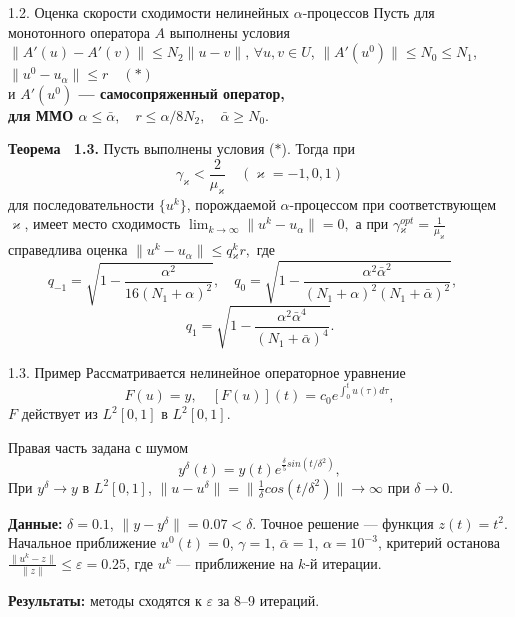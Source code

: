 \documentclass[10pt,pdf, mathserif, hyperref={unicode}]{beamer}
\begin{document}
\begin{frame}{\small 1.2. Оценка скорости сходимости нелинейных $\alpha$-процессов}
		Пусть для монотонного оператора $A$ выполнены условия  $\|A'(u)-A'(v)\|\leqslant N_2\|u-v\|$, $\forall u, v \in U$,	$\|A'(u^0)\| \leqslant N_0\leqslant N_1$,  $\|u^0-u_\alpha\| \leqslant r \quad(*)$ \\ и {\textbf{\color{blue}$A'(u^0)$ --- самосопряженный оператор, \\для ММО $\alpha \leqslant \bar\alpha, \quad r\leqslant \alpha/8N_2, \quad \bar\alpha \geqslant N_0.$}} 
	\begin{block}{\bf Теорема ~1.3.}
		Пусть выполнены условия ($*$). Тогда при
		$$\gamma _\varkappa <\frac{2}{\mu _\varkappa}\quad (\varkappa=-1,0,1)$$
		для последовательности $\{u^k\}$, порождаемой $\alpha$-процессом при соответствующем $\varkappa$, имеет место сходимость $\lim_{k\to\infty}\|u^k-u_\alpha\|=0, $ а при 
		$\gamma{_\varkappa^{opt}}=\frac{1}{\mu_\varkappa}$
		справедлива оценка $\|u^k-u_\alpha\|\leqslant q{_\varkappa^k}r,$ где
		$$
		q_{-1}=\sqrt{1-\frac{\alpha^2}{16(N_1+\alpha)^2}}, \quad q_0=\sqrt{1-\frac{\alpha^2\bar\alpha^2}{(N_1+\alpha)^2(N_1+\bar\alpha)^2}}, \quad $$$$q_1=\sqrt{1-\frac{\alpha^2\bar\alpha^4}{(N_1+\bar\alpha)^4}}.
		$$
	\end{block}
\end{frame}

\begin{frame}{1.3. Пример}
Рассматривается нелинейное операторное уравнение
	$$	F(u)=y, \quad [F(u)](t)=c_0 e^{\int_{0}^{t}u(\tau)d\tau},$$
	$F$ действует из $L^2[0,1]$ в $L^2[0,1]$. 

	
	Правая часть задана с шумом $$y^\delta(t)=y(t)e^{\frac{\delta}{5} sin(t/{\delta}^2)},$$
	При $y^\delta\to y$ в $L^2[0,1]$,  $\|u-u^\delta\|=\|\frac{1}{\delta}cos(t/{\delta}^2)\|\to\infty$ при $\delta\to 0$.
	\vskip 0.3cm

	{\textbf{\color{blue}Данные:}} $\delta=0.1$, $\|y-y^{\delta}\|=0.07<\delta$. Точное решение --- функция $z(t)=t^2$. Начальное приближение $u^0(t)=0$, $\gamma=1$, $\bar\alpha=1$, $\alpha=10^{-3}$, критерий останова $\frac{\|u^k-z\|}{\|z\|}\leqslant\varepsilon=0.25$, где $u^k$ --- приближение на $k$-й итерации.
	\vskip 0.3cm	

	{\textbf{\color{blue}Результаты:}} методы сходятся к $\varepsilon$ за 8--9 итераций.

	\let\thefootnote\relax\let\thefootnote\relax{}
\end{frame}
\end{document}
